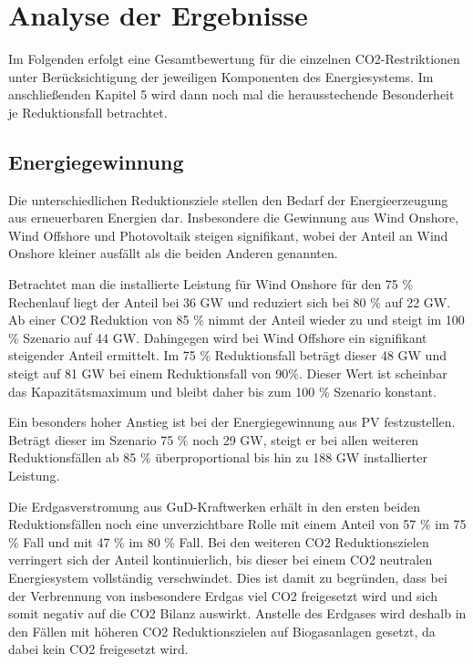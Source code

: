 \section{Analyse der Ergebnisse}
Im Folgenden erfolgt eine Gesamtbewertung für die einzelnen CO2-Restriktionen unter Berücksichtigung der jeweiligen Komponenten des Energiesystems. Im anschließenden Kapitel 5 wird dann noch mal die herausstechende Besonderheit je Reduktionsfall betrachtet. 

\subsection{Energiegewinnung}
Die unterschiedlichen Reduktionsziele stellen den Bedarf der Energieerzeugung aus erneuerbaren Energien dar. Insbesondere die Gewinnung aus Wind Onshore, Wind Offshore und Photovoltaik steigen signifikant, wobei der Anteil an Wind Onshore kleiner ausfällt als die beiden Anderen genannten. 

Betrachtet man die installierte Leistung für Wind Onshore für den 75 \% Rechenlauf liegt der Anteil bei 36 GW und reduziert sich bei 80 \% auf 22 GW. Ab einer CO2 Reduktion von 85 \% nimmt der Anteil wieder zu und steigt im 100 \% Szenario auf 44 GW. 
Dahingegen wird bei Wind Offshore ein signifikant steigender Anteil ermittelt. Im 75 \% Reduktionsfall beträgt dieser 48 GW und steigt auf 81 GW bei einem Reduktionsfall von 90\%. Dieser Wert ist scheinbar das Kapazitätsmaximum und bleibt daher bis zum 100 \% Szenario konstant.

Ein besonders hoher Anstieg ist bei der Energiegewinnung aus PV festzustellen. Beträgt dieser im Szenario 75 \% noch 29 GW, steigt er bei allen weiteren Reduktionsfällen ab 85 \% überproportional bis hin zu 188 GW installierter Leistung.

Die Erdgasverstromung aus GuD-Kraftwerken erhält in den ersten beiden Reduktionsfällen noch eine unverzichtbare Rolle mit einem Anteil von 57 \% im 75 \% Fall und mit 47 \% im 80 \% Fall. Bei den weiteren CO2 Reduktionszielen verringert sich der Anteil kontinuierlich, bis dieser bei einem CO2 neutralen Energiesystem vollständig verschwindet. Dies ist damit zu begründen, dass bei der Verbrennung von insbesondere Erdgas viel CO2 freigesetzt wird und sich somit negativ auf die CO2 Bilanz auswirkt. Anstelle des Erdgases wird deshalb in den Fällen mit höheren CO2 Reduktionszielen auf Biogasanlagen gesetzt, da dabei kein CO2 freigesetzt wird. 


